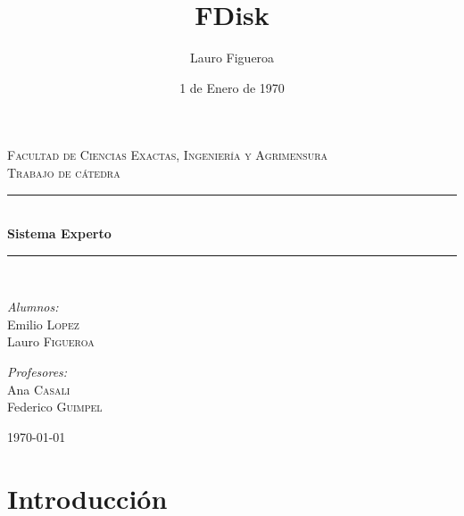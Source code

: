 \documentclass[11pt,oneside,a4paper]{article}
\title{FDisk}
\author{Lauro Figueroa}
\date{1 de Enero de 1970}
\newcommand{\HRule}{\rule{\linewidth}{0.5mm}}
\begin{document}
 
\begin{titlepage}
\begin{center}


\textsc{\LARGE Facultad de Ciencias Exactas, Ingeniería y Agrimensura}\\[1.5cm]

\textsc{\Large Trabajo de cátedra}\\[0.5cm]

\HRule \\[0.4cm]
{ \huge \bfseries Sistema Experto \\[0.4cm] }

\HRule \\[1.5cm]

\noindent
\begin{minipage}{0.4\textwidth}
\begin{flushleft} \large
\emph{Alumnos:}\\
Emilio \textsc{Lopez}\\
Lauro \textsc{Figueroa}
\end{flushleft}
\end{minipage}%
\begin{minipage}{0.4\textwidth}
\begin{flushright} \large
\emph{Profesores:} \\
Ana \textsc{Casali}\\
Federico \textsc{Guimpel}\\
\end{flushright}
\end{minipage}

\vfill

{\large \today}

\end{center}
\end{titlepage}

\newpage 

\section*{Introducción}
\end{document}
